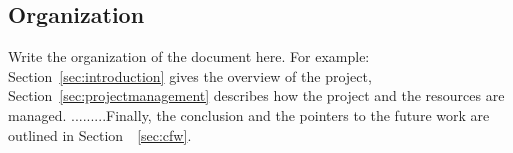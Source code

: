 \subsection{Organization} Write the organization of the document here. For example: Section~\ref{sec:introduction} gives the overview of the project, Section~\ref{sec:projectmanagement} describes how the project and the resources are managed. .........Finally, the conclusion and the pointers to the future work are outlined in Section~~\ref{sec:cfw}.

\clearpage